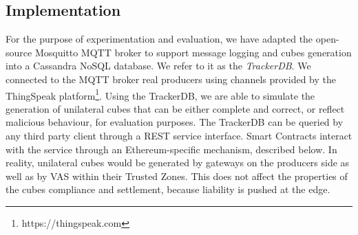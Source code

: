 \documentclass[chi_draft]{sigchi}
\begin{document}
{%


\vspace{-10pt}
\subsection{Implementation}
\label{sec:implementation}
For the purpose of experimentation and evaluation, we have adapted the open-source Mosquitto MQTT broker to support message logging and cubes generation into a Cassandra NoSQL database. We refer to it as the \textit{TrackerDB}. We connected to the MQTT broker real producers using channels provided by the ThingSpeak platform\footnote{https://thingspeak.com}.
Using the TrackerDB, we are able to simulate the generation of unilateral cubes that can be either complete and correct, or reflect malicious behaviour, for evaluation purposes.
The TrackerDB can be queried by any third party client through a REST service interface. Smart Contracts interact with the service through an Ethereum-specific mechanism, described below. 
In reality, unilateral cubes would be generated by gateways on the producers side as well as by VAS within their Trusted Zones. This does not affect the properties of the cubes compliance and settlement, because liability is pushed at the edge.
%

}
\end{document}
